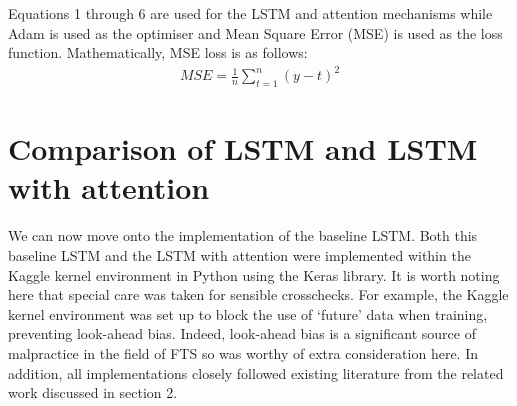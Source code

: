 \documentclass{article}
\begin{document}
Equations 1 through 6 are used for the LSTM and attention mechanisms while Adam is used as the optimiser and Mean Square Error (MSE) is used as the loss function. Mathematically, MSE loss is as follows:
\begin{align}
    MSE = \frac{1}{n} \sum_{t=1}^{n} (y-t)^2
\end{align}

\section{Comparison of LSTM and LSTM with attention}

We can now move onto the implementation of the baseline LSTM. Both this baseline LSTM and the LSTM with attention were implemented within the Kaggle kernel environment in Python using the Keras library. It is worth noting here that special care was taken for sensible crosschecks. For example, the Kaggle kernel environment was set up to block the use of `future' data when training, preventing look-ahead bias. Indeed, look-ahead bias is a significant source of malpractice in the field of FTS so was worthy of extra consideration here. In addition, all implementations closely followed existing literature from the related work discussed in section 2.
\end{document}
